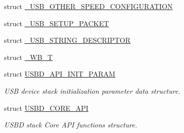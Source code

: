 \begin{DoxyCompactItemize}
struct \hyperlink{struct__USB__OTHER__SPEED__CONFIGURATION}{\+\_\+\+U\+S\+B\+\_\+\+O\+T\+H\+E\+R\+\_\+\+S\+P\+E\+E\+D\+\_\+\+C\+O\+N\+F\+I\+G\+U\+R\+A\+T\+I\+ON}
\item 
struct \hyperlink{struct__USB__SETUP__PACKET}{\+\_\+\+U\+S\+B\+\_\+\+S\+E\+T\+U\+P\+\_\+\+P\+A\+C\+K\+ET}
\item 
struct \hyperlink{struct__USB__STRING__DESCRIPTOR}{\+\_\+\+U\+S\+B\+\_\+\+S\+T\+R\+I\+N\+G\+\_\+\+D\+E\+S\+C\+R\+I\+P\+T\+OR}
\item 
struct \hyperlink{struct__WB__T}{\+\_\+\+W\+B\+\_\+T}
\item 
struct \hyperlink{structUSBD__API__INIT__PARAM}{U\+S\+B\+D\+\_\+\+A\+P\+I\+\_\+\+I\+N\+I\+T\+\_\+\+P\+A\+R\+AM}
\begin{DoxyCompactList}\small\item\em U\+SB device stack initialization parameter data structure. \end{DoxyCompactList}\item 
struct \hyperlink{structUSBD__CORE__API}{U\+S\+B\+D\+\_\+\+C\+O\+R\+E\+\_\+\+A\+PI}
\begin{DoxyCompactList}\small\item\em U\+S\+BD stack Core A\+PI functions structure. \end{DoxyCompactList}\end{DoxyCompactItemize}
